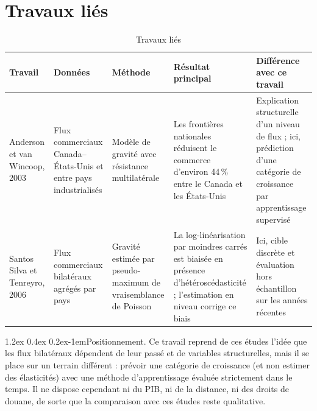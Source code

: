 \documentclass[11pt,a4paper]{article}
\makeatletter
\renewcommand\paragraph{\@startsection{paragraph}{4}{\z@}%
  {1.2ex \@plus 0.4ex \@minus 0.2ex}{-1em}{\normalfont\normalsize\bfseries}}
\makeatother
\begin{document}
\section{Travaux liés}
\label{sec:travaux}
\begin{table}[htbp]
  \centering
  \caption{Travaux liés}
  \label{tab:travaux}
  \small
  \begin{tabular}{@{}P{2.4cm} P{2.8cm} P{2.8cm} P{3.4cm} P{3.8cm}@{}}
    \toprule
    Travail & Données & Méthode & Résultat principal & Différence avec ce travail \\
    \midrule
    Anderson et van Wincoop, 2003 \cite{lie1} & Flux commerciaux Canada--États-Unis et entre pays industrialisés & Modèle de gravité avec résistance multilatérale & Les frontières nationales réduisent le commerce d'environ 44\,\% entre le Canada et les États-Unis & Explication structurelle d'un niveau de flux ; ici, prédiction d'une catégorie de croissance par apprentissage supervisé \\
    Santos Silva et Tenreyro, 2006 \cite{lie2} & Flux commerciaux bilatéraux agrégés par pays & Gravité estimée par pseudo-maximum de vraisemblance de Poisson & La log-linéarisation par moindres carrés est biaisée en présence d'hétéroscédasticité ; l'estimation en niveau corrige ce biais & Ici, cible discrète et évaluation hors échantillon sur les années récentes \\
    \bottomrule
  \end{tabular}
\end{table}

\paragraph{Positionnement.} Ce travail reprend de ces études l'idée que les flux bilatéraux dépendent de leur passé et de variables structurelles, mais il se place sur un terrain différent : prévoir une catégorie de croissance (et non estimer des élasticités) avec une méthode d'apprentissage évaluée strictement dans le temps. Il ne dispose cependant ni du PIB, ni de la distance, ni des droits de douane, de sorte que la comparaison avec ces études reste qualitative.

\end{document}
